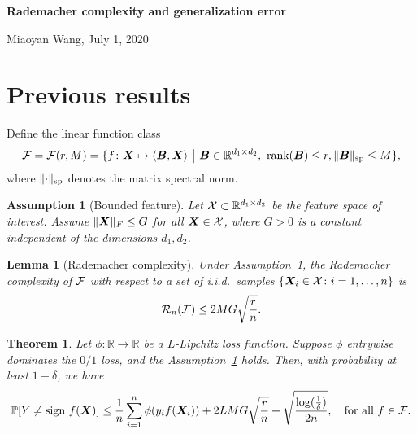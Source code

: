 \documentclass[11pt]{article}
\theoremstyle{plain}
\newtheorem{thm}{Theorem}[section]
\newtheorem{lem}{Lemma}
\newtheorem{ass}{Assumption}
\theoremstyle{definition}
\begin{document}
\begin{center}
{\Large \bf Rademacher complexity and generalization error}

Miaoyan Wang, July 1, 2020
\end{center}

\section{Previous results}\label{sec:1}
Define the linear function class
\[
\tF=\tF(r,M)=\{f\colon \mX\mapsto \langle \mB, \mX\rangle\ \big| \ \mB\in\mathbb{R}^{d_1\times d_2},\ \text{rank}(\mB)\leq r, \snormSize{}{\mB}\leq M\},
\]
where $\lVert\cdot\rVert_\text{sp}$ denotes the matrix spectral norm. 
\begin{ass}[Bounded feature]\label{ass:1} Let $\mathcal{X}\subset \mathbb{R}^{d_1\times d_2}$ be the feature space of interest. Assume $\lVert\bm X\rVert_F\leq G$ for all $\bm X\in \mathcal{X}$, where $G>0$ is a constant independent of the dimensions $d_1,d_2$. \\

\end{ass}
\begin{lem}[Rademacher complexity] Under Assumption~\ref{ass:1}, the Rademacher complexity of $\mathcal{F}$ with respect to a set of i.i.d.\ samples $\{\bm X_i\in \mathcal{X}\colon i=1,\ldots,n\}$ is
\[
\mathcal{R}_n(\mathcal{F})\leq 2MG\sqrt{r\over n}.
\]
\end{lem}
\begin{thm}\label{thm:1}Let $\phi\colon \mathbb{R}\to\mathbb{R}$ be a $L$-Lipchitz loss function. Suppose $\phi$ entrywise dominates the $0/1$ loss, and the Assumption~\ref{ass:1} holds. Then, with probability at least $1-\delta$, we have
\[
\mathbb{P}[Y\neq \text{sign } f(\bm X)]\leq {1\over n}\sum_{i=1}^n \phi(y_i f(\bm X_i))+{2LMG\sqrt{r\over n}}+\sqrt{\log({1\over \delta})\over 2n},\quad \text{for all }f\in\mathcal{F}.
\]
\end{thm}
\end{document}
